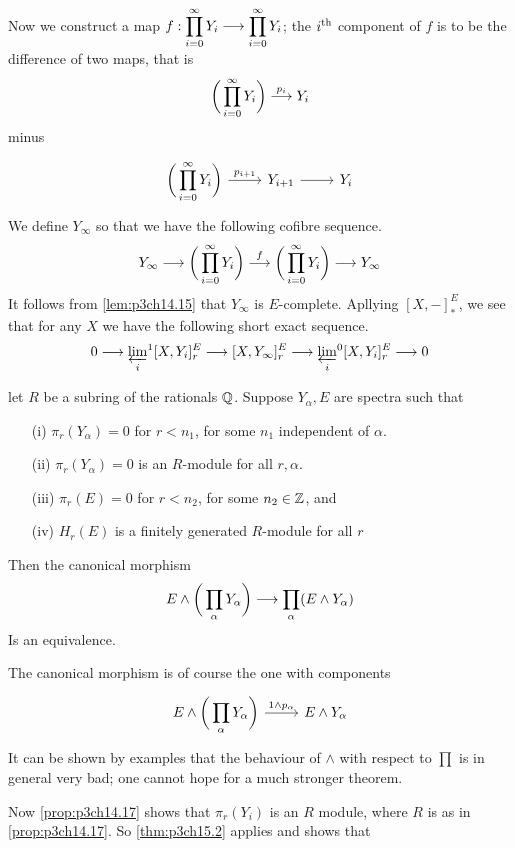 \documentclass[../main]{subfiles}
\begin{document}
Now we construct a map $\displaystyle f:\prod_{i=0}^\infty Y_i\lar{}\prod_{i=0}^\infty Y_i$; the $i^{\text{th}}$ component of $f$ is to be the difference of two maps, that is \[\bigg( \prod_{i=0}^\infty Y_i\bigg)\lar{p_i} Y_i\]
minus 
\[
\begin{tikzcd}
\displaystyle\bigg(\prod_{i=0}^\infty Y_i\bigg)\arrow[r,"p_{i+1}"] &Y_{i+1} \arrow[r] &Y_i
\end{tikzcd}
\]
We define $Y_\infty$ so that we have the following cofibre sequence.
\[Y_\infty\lar{}\bigg(\prod_{i=0}^\infty Y_i\bigg)\lar{f} \bigg(\prod_{i=0}^\infty Y_i\bigg)\lar{} Y_\infty  \]
It follows from \ref{lem:p3ch14.15} that $Y_\infty$ is $E$-complete. Apllying $[X,-]^E_\ast$, we see that for any $X$ we have the following short exact sequence.
\[0\lar{} \varprojlim_i\!^1[X,Y_i]^E_r\lar{}[X,Y_\infty]^E_r\lar{}\varprojlim_i  \!^0[X,Y_i]^E_r \lar{} 0 \]

\begin{customthm}{15.2}\label{thm:p3ch15.2}
let $R$ be a subring of the rationals $\mathbb{Q}$. Suppose $Y_\alpha,E$ are spectra such that 
\begin{enumerate}
    \item[(i)] $\pi_r(Y_\alpha)=0$ for $r<n_1$, for some $n_1$ independent of $\alpha$.
    \item[(ii)] $\pi_r(Y_\alpha)=0$ is an $R$-module for all $r,\alpha$.
    \item[(iii)] $\pi_r(E)=0$ for $r<n_2$, for some $n_2\in \mathbb{Z}$, and
    \item[(iv)] $H_r(E)$ is a finitely generated $R$-module for all $r$
\end{enumerate}
Then the canonical morphism
\[E\wedge\bigg(\prod_\alpha Y_\alpha \bigg)\lar{}\prod_\alpha (E\wedge Y_\alpha) \]
Is an equivalence.
\end{customthm}
The canonical morphism is of course the one with components 
\[
\begin{tikzcd}
E\wedge\bigg(\displaystyle\prod_\alpha Y_\alpha \bigg)\arrow[r,"1\wedge p_\alpha"]& E\wedge Y_\alpha\end{tikzcd} 
\]
It can be shown by examples that the behaviour of $\wedge$  with respect to $\displaystyle \prod$ is in general very bad; one cannot hope for a much stronger theorem.

Now \ref{prop:p3ch14.17} shows that $\pi_r(Y_i)$ is an $R$ module, where $R$ is as in \ref{prop:p3ch14.17}. So \ref{thm:p3ch15.2} applies and shows that 
\end{document}
